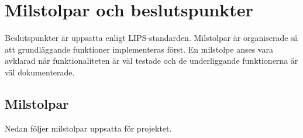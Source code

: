 \section{Milstolpar och beslutspunkter}
Beslutspunkter är uppsatta enligt LIPS-standarden. Milstolpar är organiserade så att grundläggande funktioner implementeras först. En milstolpe anses vara avklarad när funktionaliteten är väl testade och de underliggande funktionerna är väl dokumenterade.

\subsection{Milstolpar}
Nedan följer milstolpar uppsatta för projektet.
\begin{LIPSmilstolpar}
\end{LIPSmilstolpar}

